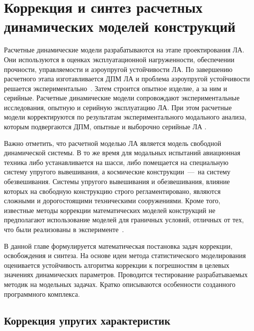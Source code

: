\chapter{Коррекция и синтез расчетных динамических моделей конструкций}

Расчетные динамические модели разрабатываются на этапе проектирования ЛА. Они используются в оценках эксплуатационной нагруженности, обеспечении прочности, управляемости и аэроупругой устойчивости ЛА. По завершению расчетного этапа изготавливается ДПМ ЛА и проблема аэроупругой устойчивости решается экспериментально~\cite{lib:modelUpdating:Karklje:force}. Затем строится опытное изделие, а за ним и серийные. Расчетные динамические модели сопровождают экспериментальные исследования, опытную и серийную эксплуатацию ЛА. При этом расчетные модели корректируются по результатам экспериментального модального анализа, которым подвергаются ДПМ, опытные и выборочно серийные ЛА \cite{lib:modelUpdating:Karklje:force, lib:modelUpdating:Berns:monophase}.

Важно отметить, что расчетной моделью ЛА является модель свободной динамической системы. В то же время для модальных испытаний авиационная техника либо устанавливается на шасси, либо помещается на специальную систему упругого вывешивания, а космические конструкции~---~на систему обезвешивания. Системы упругого вывешивания и обезвешивания, влияние которых на свободную конструкцию строго регламентировано, являются сложными и дорогостоящими техническими сооружениями. Кроме того, известные методы коррекции математических моделей конструкций не предполагают использование моделей для граничных условий, отличных от тех, что были реализованы в эксперименте~\cite{lib:modelUpdating:Kuznecov, lib:modelUpdating:Luo, lib:modelUpdating:Jang, lib:modelUpdating:Asgarieh, lib:modelUpdating:Sanayei, lib:modelUpdating:Wang}.

В данной главе формулируется математическая постановка задач коррекции, освобождения и синтеза. На основе идеи метода статистического моделирования оценивается устойчивость алгоритма коррекции к погрешностям в целевых значениях динамических параметров. Проводится тестирование разрабатываемых методик на модельных задачах. Кратко описываются особенности созданного программного комплекса.

\section{Коррекция упругих характеристик} \label{struct:updating}

